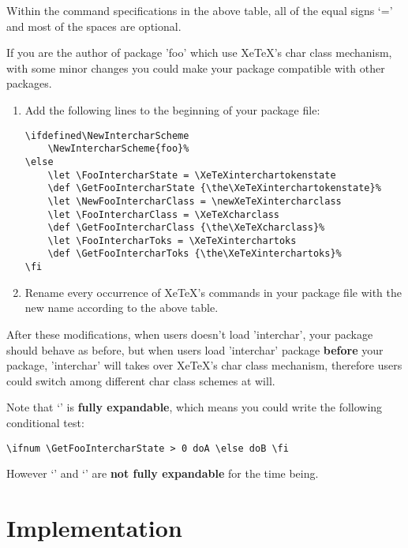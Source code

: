 \documentclass{article}
\begin{document}
Within the command specifications in the above table, all of the equal signs `='
and most of the spaces are optional.

If you are the author of package 'foo' which use XeTeX\rq s char class mechanism,
with some minor changes you could make your package compatible with other packages.

\begin{enumerate}
  \item Add the following lines to the beginning of your package file:
\begin{verbatim}
\ifdefined\NewIntercharScheme
    \NewIntercharScheme{foo}%
\else
    \let \FooIntercharState = \XeTeXinterchartokenstate
    \def \GetFooIntercharState {\the\XeTeXinterchartokenstate}%
    \let \NewFooIntercharClass = \newXeTeXintercharclass
    \let \FooIntercharClass = \XeTeXcharclass
    \def \GetFooIntercharClass {\the\XeTeXcharclass}%
    \let \FooIntercharToks = \XeTeXinterchartoks
    \def \GetFooIntercharToks {\the\XeTeXinterchartoks}%
\fi
\end{verbatim}
  \item Rename every occurrence of XeTeX\rq s commands in your package file with the new name
        according to the above table.
\end{enumerate}

After these modifications, when users doesn\rq t load 'interchar', your package should
behave as before, but when users load 'interchar' package \textbf{before} your package,
'interchar' will takes over XeTeX\rq s char class mechanism, therefore users could switch
among different char class schemes at will.

Note that `\GetFooIntercharState' is \textbf{fully expandable}, which means you could write
the following conditional test:
\begin{verbatim}\ifnum \GetFooIntercharState > 0 doA \else doB \fi\end{verbatim}
However `\GetFooIntercharClass' and `\GetFooIntercharToks' are
\textbf{not fully expandable} for the time being.

\section{Implementation}

\NoEmptyCodeLines
{}
\end{document}
